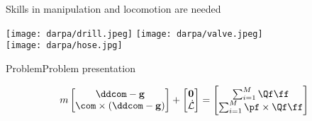 \begin{frame}{Skills in manipulation and locomotion are needed}
\begin{center}
  \texttt{[image: darpa/drill.jpeg]}
  \hspace*{0.5cm}
  \texttt{[image: darpa/valve.jpeg]}\\[0.2cm]
  \texttt{[image: darpa/hose.jpg]}
\end{center}
\end{frame}


\begin{frame}{Problem}{Problem presentation}

\begin{equation}
  \label{eq:equilibrium_constraints}
  m
  \begin{bmatrix}
  \ddcom - {\bf g} \\
  \com \times (\ddcom - {\bf g})
  \end{bmatrix}
  +
  \begin{bmatrix}
  {\bf 0} \\
  \dot{\mathcal{L}}
  \end{bmatrix}
  =
  \begin{bmatrix}
  \sum_{i=1}^{M}
  \Qf \ff \\
  \sum_{i=1}^{M}
  \pf \times \Qf  \ff
\end{bmatrix}
\end{equation}


\end{frame}